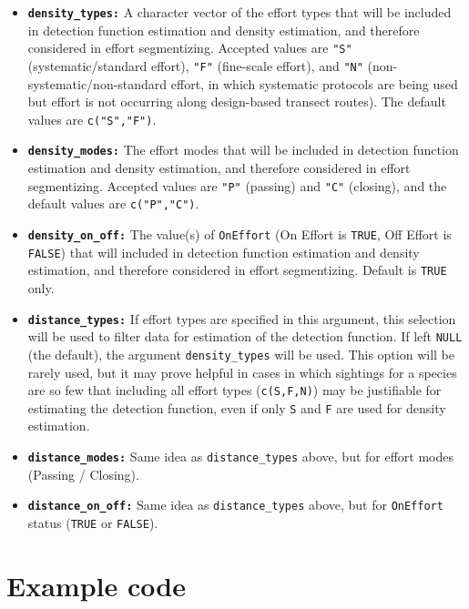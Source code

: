 \documentclass[
]{book}
\begin{document}
\begin{itemize}
\item
  \textbf{\texttt{density\_types:}} A character vector of the effort types that will be included in detection function estimation and density estimation, and therefore considered in effort segmentizing. Accepted values are \texttt{"S"} (systematic/standard effort), \texttt{"F"} (fine-scale effort), and \texttt{"N"} (non-systematic/non-standard effort, in which systematic protocols are being used but effort is not occurring along design-based transect routes). The default values are \texttt{c("S","F")}.
\item
  \textbf{\texttt{density\_modes:}} The effort modes that will be included in detection function estimation and density estimation, and therefore considered in effort segmentizing. Accepted values are \texttt{"P"} (passing) and \texttt{"C"} (closing), and the default values are \texttt{c("P","C")}.
\item
  \textbf{\texttt{density\_on\_off:}} The value(s) of \texttt{OnEffort} (On Effort is \texttt{TRUE}, Off Effort is \texttt{FALSE}) that will included in detection function estimation and density estimation, and therefore considered in effort segmentizing. Default is \texttt{TRUE} only.
\item
  \textbf{\texttt{distance\_types:}} If effort types are specified in this argument, this selection will be used to filter data for estimation of the detection function. If left \texttt{NULL} (the default), the argument \texttt{density\_types} will be used. This option will be rarely used, but it may prove helpful in cases in which sightings for a species are so few that including all effort types (\texttt{c(\textquotesingle{}S\textquotesingle{},\textquotesingle{}F\textquotesingle{},\textquotesingle{}N\textquotesingle{})}) may be justifiable for estimating the detection function, even if only \texttt{\textquotesingle{}S\textquotesingle{}} and \texttt{\textquotesingle{}F\textquotesingle{}} are used for density estimation.
\item
  \textbf{\texttt{distance\_modes:}} Same idea as \texttt{distance\_types} above, but for effort modes (Passing / Closing).
\item
  \textbf{\texttt{distance\_on\_off:}} Same idea as \texttt{distance\_types} above, but for \texttt{OnEffort} status (\texttt{TRUE} or \texttt{FALSE}).
\end{itemize}

\hypertarget{example-code}{%
\section*{Example code}\label{example-code}}
\end{document}
